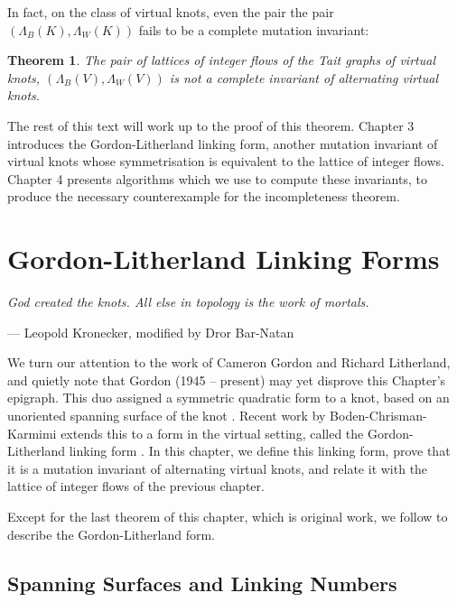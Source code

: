 \documentclass[12pt]{report}
\newtheorem*{theorem}{Theorem}
\theoremstyle{upright}
\begin{document}
In fact, on the class of virtual knots, even the pair the pair $\left(\Lambda_{B}(K), \Lambda_{W}(K)\right)$ fails to be a complete mutation invariant:

\begin{theorem}
The pair of lattices of integer flows of the Tait graphs of virtual knots, $(\Lambda_{B}(V), \Lambda_{W}(V))$ is not a complete invariant of alternating virtual knots.
\end{theorem}

The rest of this text will work up to the proof of this theorem. Chapter 3 introduces the Gordon-Litherland linking form, another mutation invariant of virtual knots whose symmetrisation is equivalent to the lattice of integer flows. Chapter 4 presents algorithms which we use to compute these invariants, to produce the necessary counterexample for the incompleteness theorem.


\chapter{Gordon-Litherland Linking Forms}

\epigraph{\itshape God created the knots. All else in topology is the work of mortals.}{--- Leopold Kronecker, modified by Dror Bar-Natan}

We turn our attention to the work of Cameron Gordon and Richard Litherland, and quietly note that Gordon (1945 -- present) may yet disprove this Chapter's epigraph. This duo assigned a symmetric quadratic form to a knot, based on an unoriented spanning surface of the knot \cite{signature-of-a-link}. Recent work by Boden-Chrisman-Karmimi extends this to a form in the virtual setting, called the Gordon-Litherland linking form \cite{gordon-litherland-pairing-thickened-surfaces}. In this chapter, we define this linking form, prove that it is a mutation invariant of alternating virtual knots, and relate it with the lattice of integer flows of the previous chapter.

Except for the last theorem of this chapter, which is original work, we follow \cite{gordon-litherland-pairing-thickened-surfaces, alternating-links-thickened-surfaces, mock-seifert-matrices, virtual-knot-groups-almost-classical-knots} to describe the Gordon-Litherland form.

\section{Spanning Surfaces and Linking Numbers}
\end{document}
